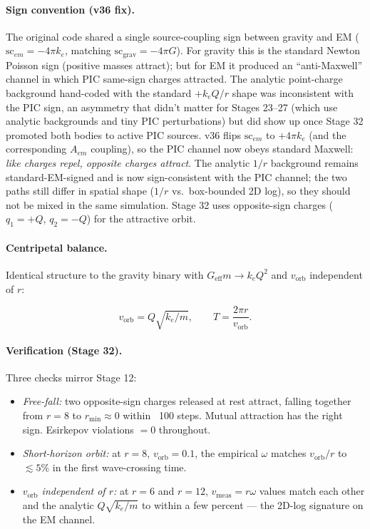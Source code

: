\documentclass[11pt,a4paper]{article}
\begin{document}
\paragraph{Sign convention (v36 fix).}  The original code shared a
single source-coupling sign between gravity and EM ($\mathrm{sc}_{em}
= -4\pi k_e$, matching $\mathrm{sc}_{\mathrm{grav}} = -4\pi G$).
For gravity this is the standard Newton Poisson sign (positive masses
attract); but for EM it produced an ``anti-Maxwell'' channel in which
PIC same-sign charges attracted.  The analytic point-charge background
hand-coded with the standard $+k_e Q / r$ shape was inconsistent with
the PIC sign, an asymmetry that didn't matter for Stages 23--27 (which
use analytic backgrounds and tiny PIC perturbations) but did show up
once Stage 32 promoted both bodies to active PIC sources.  v36 flips
$\mathrm{sc}_{em}$ to $+4 \pi k_e$ (and the corresponding $A_{em}$
coupling), so the PIC channel now obeys standard Maxwell:
\emph{like charges repel, opposite charges attract}.  The analytic
$1/r$ background remains standard-EM-signed and is now sign-consistent
with the PIC channel; the two paths still differ in spatial shape
($1/r$ vs.\ box-bounded 2D log), so they should not be mixed in the
same simulation.  Stage 32 uses opposite-sign charges
($q_1 = +Q$, $q_2 = -Q$) for the attractive orbit.

\paragraph{Centripetal balance.}  Identical structure to the gravity
binary with $G_{\mathrm{eff}} m \to k_e Q^2$ and $v_{\mathrm{orb}}$
independent of $r$:

\begin{equation}
  v_{\mathrm{orb}} = Q\sqrt{k_e / m},
  \qquad T = \frac{2\pi r}{v_{\mathrm{orb}}}.
\end{equation}

\paragraph{Verification (Stage 32).}  Three checks mirror Stage 12:

\begin{itemize}
  \item \emph{Free-fall:} two opposite-sign charges released at rest
        attract, falling together from $r = 8$ to $r_{\min} \approx 0$
        within ~100 steps.  Mutual attraction has the right sign.
        Esirkepov violations $= 0$ throughout.
  \item \emph{Short-horizon orbit:} at $r = 8$, $v_{\mathrm{orb}} = 0.1$,
        the empirical $\omega$ matches $v_{\mathrm{orb}}/r$ to $\lesssim 5\%$
        in the first wave-crossing time.
  \item \emph{$v_{\mathrm{orb}}$ independent of $r$:} at $r = 6$ and
        $r = 12$, $v_{\mathrm{meas}} = r \omega$ values match each
        other and the analytic $Q\sqrt{k_e/m}$ to within a few percent
        --- the 2D-log signature on the EM channel.
\end{itemize}
\end{document}
